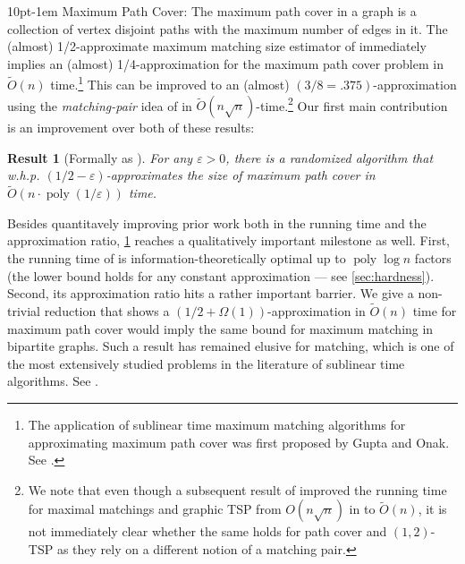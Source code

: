\documentclass[letterpaper,11pt]{article}
\makeatletter
\renewcommand{\epsilon}{\varepsilon}
\DeclareMathOperator{\poly}{poly}
\newtheorem{result}{Result}
\newenvironment{graytbox}{
\par\addvspace{0.1cm}
\begin{tcolorbox}[width=\textwidth,
                  boxsep=5pt,
                  left=1pt,
                  right=1pt,
                  top=2pt,
                  bottom=2pt,
                  boxrule=0pt,
                  arc=0pt,
                  colback=mylightgray,
                  colframe=black,
                  ]%
}{
\end{tcolorbox}
}
\renewcommand{\paragraph}{%
  \@startsection{paragraph}{4}%
  {\z@}{10pt}{-1em}%
  {\normalfont\normalsize\bfseries}%
}
\makeatother
\begin{document}
\paragraph{Maximum Path Cover:}  The maximum path cover in a graph is a collection of vertex disjoint paths with the maximum number of edges in it. The (almost) 1/2-approximate maximum matching size estimator of \citet*{behnezhad2021} immediately implies an (almost) 1/4-approximation for the maximum path cover problem in $\widetilde{O}(n)$ time.\footnote{The application of sublinear time maximum matching algorithms for approximating maximum path cover was first proposed by Gupta and Onak. See \cite{sublinear-info}.} This can be improved to an (almost) $(3/8 = .375)$-approximation using the {\em matching-pair} idea of \citet*{chen2020} in $\widetilde{O}(n \sqrt{n})$-time.\footnote{We note that even though a subsequent result of \citet*{behnezhad2021} improved the running time for maximal matchings and graphic TSP from $O(n\sqrt{n})$ in \cite{chen2020} to $\widetilde{O}(n)$, it is not immediately clear whether the same holds for path cover and $(1,2)$-TSP as they rely on a different notion of a matching pair.} Our first main contribution is an improvement over both of these results:

\begin{graytbox}
\begin{result}[Formally as ]\label{res:path-cover}
    For any $\epsilon > 0$, there is a randomized algorithm that w.h.p. $(1/2-\epsilon)$-approximates the size of maximum path cover in $\widetilde{O}(n \cdot \poly(1/\epsilon))$ time.
\end{result}
\end{graytbox}

Besides quantitavely improving prior work both in the running time and the approximation ratio, \cref{res:path-cover} reaches a qualitatively important milestone as well. First, the running time of  is information-theoretically optimal up to $\poly\log n$ factors (the lower bound holds for any constant approximation --- see \cref{sec:hardness}). Second, its approximation ratio hits a rather important barrier. We give a non-trivial reduction that shows a $(1/2+\Omega(1))$-approximation in $\widetilde{O}(n)$ time for maximum path cover would imply the same bound for maximum matching in bipartite graphs. Such a result has remained elusive for matching, which is one of the most extensively studied problems in the literature of sublinear time algorithms. See .
\end{document}
